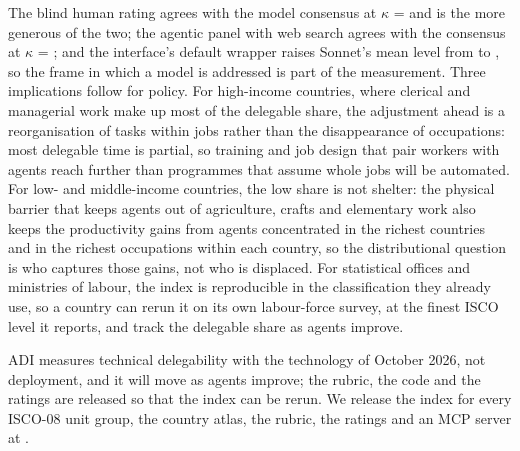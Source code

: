 The blind human rating agrees with the model consensus at $\kappa$ =  and is the more generous of the two; the agentic panel with web search agrees with the consensus at $\kappa$ = ; and the interface's default wrapper raises Sonnet's mean level from  to , so the frame in which a model is addressed is part of the measurement.
Three implications follow for policy.
For high-income countries, where clerical and managerial work make up most of the delegable share, the adjustment ahead is a reorganisation of tasks within jobs rather than the disappearance of occupations: most delegable time is partial, so training and job design that pair workers with agents reach further than programmes that assume whole jobs will be automated.
For low- and middle-income countries, the low share is not shelter: the physical barrier that keeps agents out of agriculture, crafts and elementary work also keeps the productivity gains from agents concentrated in the richest countries and in the richest occupations within each country, so the distributional question is who captures those gains, not who is displaced.
For statistical offices and ministries of labour, the index is reproducible in the classification they already use, so a country can rerun it on its own labour-force survey, at the finest ISCO level it reports, and track the delegable share as agents improve.

ADI measures technical delegability with the technology of October 2026, not deployment, and it will move as agents improve; the rubric, the code and the ratings are released so that the index can be rerun.
We release the index for every ISCO-08 unit group, the country atlas, the rubric, the ratings and an MCP server at \repourl.

